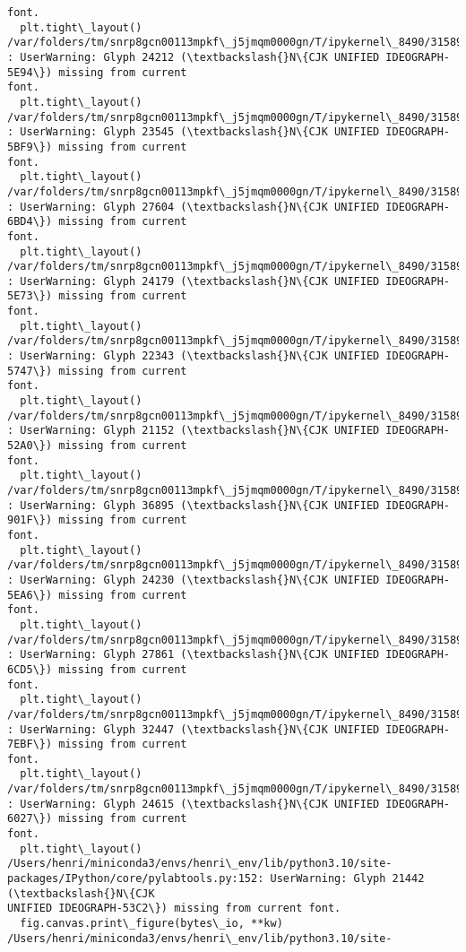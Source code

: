 \documentclass[11pt]{article}
\begin{document}
\begin{Verbatim}[commandchars=\\\{\}]
font.
  plt.tight\_layout()
/var/folders/tm/snrp8gcn00113mpkf\_j5jmqm0000gn/T/ipykernel\_8490/3158952429.py:35
: UserWarning: Glyph 24212 (\textbackslash{}N\{CJK UNIFIED IDEOGRAPH-5E94\}) missing from current
font.
  plt.tight\_layout()
/var/folders/tm/snrp8gcn00113mpkf\_j5jmqm0000gn/T/ipykernel\_8490/3158952429.py:35
: UserWarning: Glyph 23545 (\textbackslash{}N\{CJK UNIFIED IDEOGRAPH-5BF9\}) missing from current
font.
  plt.tight\_layout()
/var/folders/tm/snrp8gcn00113mpkf\_j5jmqm0000gn/T/ipykernel\_8490/3158952429.py:35
: UserWarning: Glyph 27604 (\textbackslash{}N\{CJK UNIFIED IDEOGRAPH-6BD4\}) missing from current
font.
  plt.tight\_layout()
/var/folders/tm/snrp8gcn00113mpkf\_j5jmqm0000gn/T/ipykernel\_8490/3158952429.py:35
: UserWarning: Glyph 24179 (\textbackslash{}N\{CJK UNIFIED IDEOGRAPH-5E73\}) missing from current
font.
  plt.tight\_layout()
/var/folders/tm/snrp8gcn00113mpkf\_j5jmqm0000gn/T/ipykernel\_8490/3158952429.py:35
: UserWarning: Glyph 22343 (\textbackslash{}N\{CJK UNIFIED IDEOGRAPH-5747\}) missing from current
font.
  plt.tight\_layout()
/var/folders/tm/snrp8gcn00113mpkf\_j5jmqm0000gn/T/ipykernel\_8490/3158952429.py:35
: UserWarning: Glyph 21152 (\textbackslash{}N\{CJK UNIFIED IDEOGRAPH-52A0\}) missing from current
font.
  plt.tight\_layout()
/var/folders/tm/snrp8gcn00113mpkf\_j5jmqm0000gn/T/ipykernel\_8490/3158952429.py:35
: UserWarning: Glyph 36895 (\textbackslash{}N\{CJK UNIFIED IDEOGRAPH-901F\}) missing from current
font.
  plt.tight\_layout()
/var/folders/tm/snrp8gcn00113mpkf\_j5jmqm0000gn/T/ipykernel\_8490/3158952429.py:35
: UserWarning: Glyph 24230 (\textbackslash{}N\{CJK UNIFIED IDEOGRAPH-5EA6\}) missing from current
font.
  plt.tight\_layout()
/var/folders/tm/snrp8gcn00113mpkf\_j5jmqm0000gn/T/ipykernel\_8490/3158952429.py:35
: UserWarning: Glyph 27861 (\textbackslash{}N\{CJK UNIFIED IDEOGRAPH-6CD5\}) missing from current
font.
  plt.tight\_layout()
/var/folders/tm/snrp8gcn00113mpkf\_j5jmqm0000gn/T/ipykernel\_8490/3158952429.py:35
: UserWarning: Glyph 32447 (\textbackslash{}N\{CJK UNIFIED IDEOGRAPH-7EBF\}) missing from current
font.
  plt.tight\_layout()
/var/folders/tm/snrp8gcn00113mpkf\_j5jmqm0000gn/T/ipykernel\_8490/3158952429.py:35
: UserWarning: Glyph 24615 (\textbackslash{}N\{CJK UNIFIED IDEOGRAPH-6027\}) missing from current
font.
  plt.tight\_layout()
/Users/henri/miniconda3/envs/henri\_env/lib/python3.10/site-
packages/IPython/core/pylabtools.py:152: UserWarning: Glyph 21442 (\textbackslash{}N\{CJK
UNIFIED IDEOGRAPH-53C2\}) missing from current font.
  fig.canvas.print\_figure(bytes\_io, **kw)
/Users/henri/miniconda3/envs/henri\_env/lib/python3.10/site-

\end{Verbatim}
\end{document}
